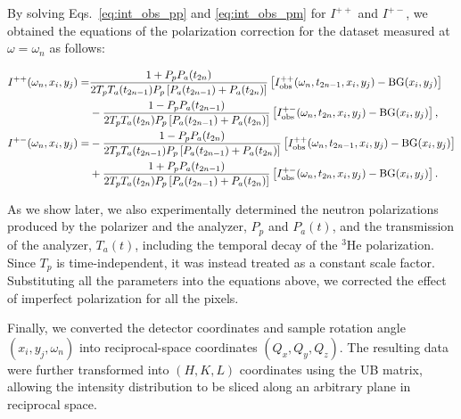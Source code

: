 \documentclass[%
 reprint,
superscriptaddress,
 amsmath,amssymb,
 aps,
floatfix,
]{revtex4-2}
\newcommand{\He}{$^3$He }
\newcommand{\Hensf}{$^3$He-NSF}
\begin{document}
By solving Eqs.~\ref{eq:int_obs_pp} and \ref{eq:int_obs_pm} for $I^{++}$ and $I^{+-}$, we obtained the equations of the polarization correction for the dataset measured at $\omega=\omega_n$ as follows:
\begin{widetext}
    \begin{align}
        I^{++}(\omega_n,x_i,y_j) =&
        \frac{1+P_pP_a(t_{2n})}
        {2T_pT_a(t_{2n-1})P_p\left[P_a(t_{2n-1})+P_a(t_{2n})\right]}
        \left[I^{++}_\mathrm{obs}(\omega_n,t_{2n-1},x_i,y_j)-\mathrm{BG}(x_i,y_j)\right]
        \notag\\
        &-
        \frac{1-P_pP_a(t_{2n-1})}
        {2T_pT_a(t_{2n})P_p\left[P_a(t_{2n-1})+P_a(t_{2n})\right]}
        \left[I^{+-}_\mathrm{obs}(\omega_n,t_{2n},x_i,y_j)-\mathrm{BG}(x_i,y_j)\right],
        \\
        I^{+-}(\omega_n,x_i,y_j) =&
        -
        \frac{1-P_pP_a(t_{2n})}
        {2T_pT_a(t_{2n-1})P_p\left[P_a(t_{2n-1})+P_a(t_{2n})\right]}
        \left[I^{++}_\mathrm{obs}(\omega_n,t_{2n-1},x_i,y_j)-\mathrm{BG}(x_i,y_j)\right]
        \notag\\
        &+
        \frac{1+P_pP_a(t_{2n-1})}
        {2T_pT_a(t_{2n})P_p\left[P_a(t_{2n-1})+P_a(t_{2n})\right]}
        \left[I^{+-}_\mathrm{obs}(\omega_n,t_{2n},x_i,y_j)-\mathrm{BG}(x_i,y_j)\right].
        \label{eq:int_corr}
    \end{align}
\end{widetext}
As we show later, we also experimentally determined the neutron polarizations produced by the polarizer and the analyzer, $P_p$ and $P_a(t)$, and the transmission of the analyzer, $T_a(t)$, including the temporal decay of the \He polarization.
Since $T_p$ is time-independent, it was instead treated as a constant scale factor.
Substituting all the parameters into the equations above, we corrected the effect of imperfect polarization for all the pixels.

Finally, we converted the detector coordinates and sample rotation angle $(x_i, y_j, \omega_n)$ into reciprocal-space coordinates $(Q_x,Q_y,Q_z)$.
The resulting data were further transformed into $(H,K,L)$ coordinates using the UB matrix, allowing the intensity distribution to be sliced along an arbitrary plane in reciprocal space.
\end{document}
